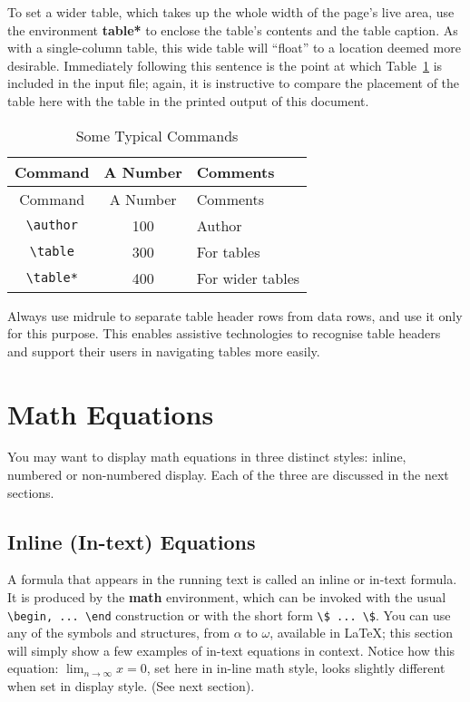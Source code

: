 \documentclass[manuscript,screen]{acmart}
\begin{document}
To set a wider table, which takes up the whole width of the page's live
area, use the environment \textbf{table*} to enclose the table's
contents and the table caption. As with a single-column table, this wide
table will ``float'' to a location deemed more desirable. Immediately
following this sentence is the point at which Table~\ref{tbl-commands}
is included in the input file; again, it is instructive to compare the
placement of the table here with the table in the printed output of this
document.

\begin{longtable}[]{@{}ccl@{}}
\caption{Some Typical Commands}\label{tbl-commands}\tabularnewline
\toprule\noalign{}
Command & A Number & Comments \\
\midrule\noalign{}
\endfirsthead
\toprule\noalign{}
Command & A Number & Comments \\
\midrule\noalign{}
\endhead
\bottomrule\noalign{}
\endlastfoot
\texttt{\textbackslash{}author} & 100 & Author \\
\texttt{\textbackslash{}table} & 300 & For tables \\
\texttt{\textbackslash{}table*} & 400 & For wider tables \\
\end{longtable}

Always use midrule to separate table header rows from data rows, and use
it only for this purpose. This enables assistive technologies to
recognise table headers and support their users in navigating tables
more easily.

\section{Math Equations}\label{math-equations}

You may want to display math equations in three distinct styles: inline,
numbered or non-numbered display. Each of the three are discussed in the
next sections.

\subsection{Inline (In-text) Equations}\label{inline-in-text-equations}

A formula that appears in the running text is called an inline or
in-text formula. It is produced by the \textbf{math} environment, which
can be invoked with the usual
\texttt{\textbackslash{}begin,\ ...\ \textbackslash{}end} construction
or with the short form
\texttt{\textbackslash{}\$\ ...\ \textbackslash{}\$}. You can use any of
the symbols and structures, from \(\alpha\) to \(\omega\), available in
\LaTeX\citep{Lamport:LaTeX}; this section will simply show a few
examples of in-text equations in context. Notice how this equation:
\(\lim_{n\rightarrow \infty}x=0\), set here in in-line math style, looks
slightly different when set in display style. (See next section).
\end{document}
